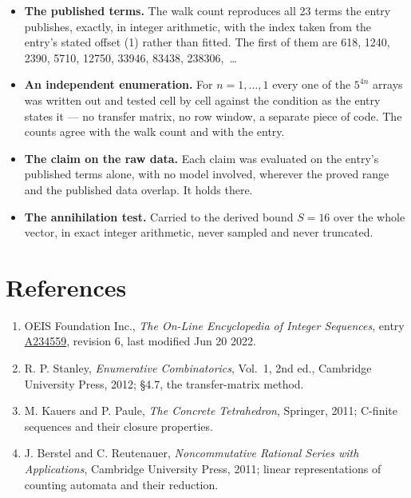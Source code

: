 \documentclass[11pt]{article}
\theoremstyle{definition}
\begin{document}
\begin{itemize}

\item {\bfseries The published terms.} The walk count reproduces all 23 terms the entry publishes, exactly, in integer arithmetic, with the index taken from the entry's stated offset (1) rather than fitted. The first of them are 618, 1240, 2390, 5710, 12750, 33946, 83438, 238306,~\dots

\item {\bfseries An independent enumeration.} For $n = 1,\dots,1$ every one of the $5^{4n}$ arrays was written out and tested cell by cell against the condition as the entry states it --- no transfer matrix, no row window, a separate piece of code. The counts agree with the walk count and with the entry.

\item {\bfseries The claim on the raw data.} Each claim was evaluated on the entry's published terms alone, with no model involved, wherever the proved range and the published data overlap. It holds there.

\item {\bfseries The annihilation test.} Carried to the derived bound $S = 16$ over the whole vector, in exact integer arithmetic, never sampled and never truncated.

\end{itemize}

\section{References}

\begin{enumerate}

\item OEIS Foundation Inc., \emph{The On-Line Encyclopedia of Integer Sequences}, entry \href{https://oeis.org/A234559}{A234559}, revision 6, last modified Jun 20 2022.

\item R. P. Stanley, \emph{Enumerative Combinatorics}, Vol.~1, 2nd ed., Cambridge University Press, 2012; \S4.7, the transfer-matrix method.

\item M. Kauers and P. Paule, \emph{The Concrete Tetrahedron}, Springer, 2011; C-finite sequences and their closure properties.

\item J. Berstel and C. Reutenauer, \emph{Noncommutative Rational Series with Applications}, Cambridge University Press, 2011; linear representations of counting automata and their reduction.

\end{enumerate}
\end{document}
